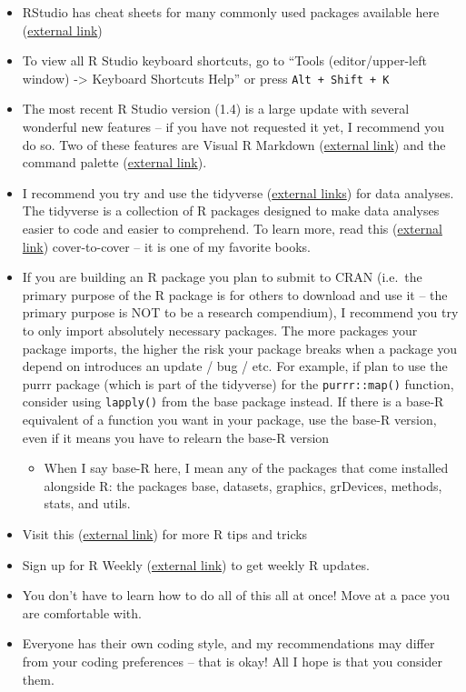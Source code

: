 \documentclass[
]{book}
\providecommand{\tightlist}{%
  \setlength{\itemsep}{0pt}\setlength{\parskip}{0pt}}
\begin{document}
\begin{itemize}
\tightlist
\item
  RStudio has cheat sheets for many commonly used packages available here (\href{https://www.rstudio.com/resources/cheatsheets/}{external link})
\item
  To view all R Studio keyboard shortcuts, go to ``Tools (editor/upper-left window) -\textgreater{} Keyboard Shortcuts Help'' or press \texttt{Alt\ +\ Shift\ +\ K}
\item
  The most recent R Studio version (1.4) is a large update with several wonderful new features -- if you have not requested it yet, I recommend you do so. Two of these features are Visual R Markdown (\href{https://blog.rstudio.com/2020/09/30/rstudio-v1-4-preview-visual-markdown-editing/}{external link}) and the command palette (\href{https://blog.rstudio.com/2020/10/14/rstudio-v1-4-preview-command-palette/}{external link}).
\item
  I recommend you try and use the tidyverse (\href{https://www.tidyverse.org/}{external links}) for data analyses. The tidyverse is a collection of R packages designed to make data analyses easier to code and easier to comprehend. To learn more, read this (\href{https://r4ds.had.co.nz/}{external link}) cover-to-cover -- it is one of my favorite books.
\item
  If you are building an R package you plan to submit to CRAN (i.e.~the primary purpose of the R package is for others to download and use it -- the primary purpose is NOT to be a research compendium), I recommend you try to only import absolutely necessary packages. The more packages your package imports, the higher the risk your package breaks when a package you depend on introduces an update / bug / etc. For example, if plan to use the purrr package (which is part of the tidyverse) for the \texttt{purrr::map()} function, consider using \texttt{lapply()} from the base package instead. If there is a base-R equivalent of a function you want in your package, use the base-R version, even if it means you have to relearn the base-R version

  \begin{itemize}
  \tightlist
  \item
    When I say base-R here, I mean any of the packages that come installed alongside R: the packages base, datasets, graphics, grDevices, methods, stats, and utils.
  \end{itemize}
\item
  Visit this (\href{https://twitter.com/rstudiotips?lang=en}{external link}) for more R tips and tricks
\item
  Sign up for R Weekly (\href{https://rweekly.org/}{external link}) to get weekly R updates.
\item
  You don't have to learn how to do all of this all at once! Move at a pace you are comfortable with.
\item
  Everyone has their own coding style, and my recommendations may differ from your coding preferences -- that is okay! All I hope is that you consider them.
\end{itemize}
\end{document}
